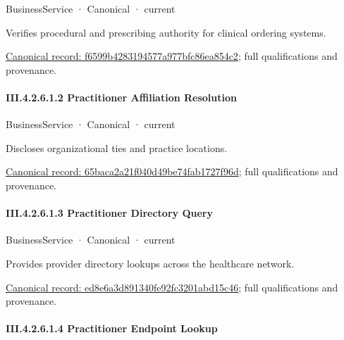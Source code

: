 \label{element:f6599b4283194577a977bfc86ea854c2}
{\small BusinessService · Canonical · current}\par

Verifies procedural and prescribing authority for clinical ordering systems.


{\footnotesize \href{../../../../continuum/business/business-service/f6599b4283194577a977bfc86ea854c2.md}{Canonical record: f6599b4283194577a977bfc86ea854c2}; full qualifications and provenance.}\par
\paragraph*{III.4.2.6.1.2 Practitioner Affiliation Resolution}
\label{navigation:III.4.2.6.1.2}

\label{element:65baca2a21f040d49be74fab1727f96d}
{\small BusinessService · Canonical · current}\par

Discloses organizational ties and practice locations.


{\footnotesize \href{../../../../continuum/business/business-service/65baca2a21f040d49be74fab1727f96d.md}{Canonical record: 65baca2a21f040d49be74fab1727f96d}; full qualifications and provenance.}\par
\paragraph*{III.4.2.6.1.3 Practitioner Directory Query}
\label{navigation:III.4.2.6.1.3}

\label{element:ed8e6a3d891340fe92fc3201abd15c46}
{\small BusinessService · Canonical · current}\par

Provides provider directory lookups across the healthcare network.


{\footnotesize \href{../../../../continuum/business/business-service/ed8e6a3d891340fe92fc3201abd15c46.md}{Canonical record: ed8e6a3d891340fe92fc3201abd15c46}; full qualifications and provenance.}\par
\paragraph*{III.4.2.6.1.4 Practitioner Endpoint Lookup}
\label{navigation:III.4.2.6.1.4}

